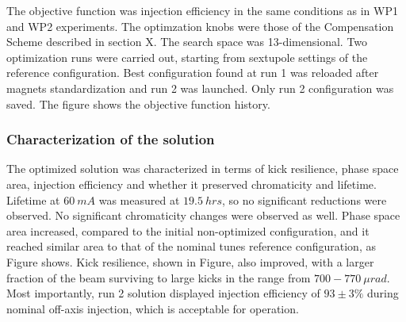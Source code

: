 The objective function was injection efficiency in the same conditions as in WP1 and WP2 experiments. The optimzation knobs were those of the Compensation Scheme described in section X. The search space was 13-dimensional. Two optimization runs were carried out, starting from sextupole settings of the reference configuration. Best configuration found at run 1 was reloaded after magnets standardization and run 2 was launched. Only run 2 configuration was saved. The figure shows the objective function history.
\subsubsection{Characterization of the solution}
The optimized solution was characterized in terms of kick resilience, phase space area, injection efficiency and whether it preserved chromaticity and lifetime.  Lifetime at $60~\unit{mA}$ was measured at $19.5~\unit{hrs}$, so no significant reductions were observed. No significant chromaticity changes were observed as well. Phase space area increased, compared to the initial non-optimized configuration, and it reached similar area to that of the nominal tunes reference configuration, as Figure shows. Kick resilience, shown in Figure, also improved, with a larger fraction of the beam surviving to large kicks in the range from $700-770~\unit{\mu rad}$. Most importantly, run 2 solution displayed injection efficiency of $93\pm3\%$ during nominal off-axis injection, which is acceptable for operation.
